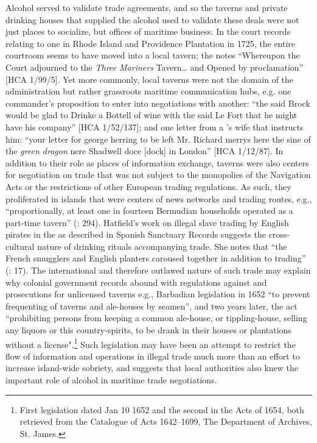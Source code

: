 Alcohol served to validate trade agreements, and so the taverns and private drinking houses that supplied the alcohol used to validate these deals were not just places to socialize, but offices of maritime business. In the court records relating to one  in Rhode Island and Providence Plantation in 1725, the entire courtroom seems to have moved into a local tavern; the  notes “Whereupon the Court adjourned to the \textit{Three Mariners} Tavern… and Opened by proclamation” [HCA 1/99/5]. Yet more commonly, local taverns were not the domain of the administration but rather grassroots maritime communication hubs, e.g. one commander’s proposition to enter into negotiations with another: “the said Brock would be glad to Drinke a Bottell of wine with the said Le Fort that he might have his company” [HCA 1/52/137]; and one letter from a ’s wife that instructs him: “your letter for george herring to be left Mr. Richard merrys here the sine of the \textit{green dragon} nere Shadwell doce [dock] in London” [HCA 1/12/87]. In addition to their role as places of information exchange, taverns were also centers for negotiation on  trade that was not subject to the monopolies of the Navigation Acts or the restrictions of other European trading regulations. As such, they proliferated in islands that were centers of news networks and trading routes, e.g., “proportionally, at least one in fourteen Bermudian households operated as a part-time tavern” (\citealt{Jarvis2010}: 294). Hatfield’s work on illegal slave trading by English pirates in the  as described in Spanish Sanctuary Records suggests the cross-cultural nature of drinking rituals accompanying trade.  She notes that “the French smugglers and English planters caroused together in addition to trading” (\citealt{Hatfield2016}: 17). The international and therefore outlawed nature of such trade may explain why colonial government records abound with regulations against and prosecutions for unlicensed taverns e.g., Barbadian legislation in 1652 “to prevent frequenting of taverns and ale-houses by seamen”, and two years later, the act “prohibiting persons from keeping a common ale-house, or tippling-house, selling any liquors or this country-spirits, to be drank in their houses or plantations without a license".\footnote{First legislation dated Jan 10 1652 and the second in the Acts of 1654, both retrieved from the Catalogue of {Acts 1642}–1699, The  Department of Archives, St. James.} Such legislation may have been an attempt to restrict the flow of information and operations in illegal trade much more than an effort to increase island-wide sobriety, and suggests that local authorities also knew the important role of alcohol in maritime trade negotiations. 

